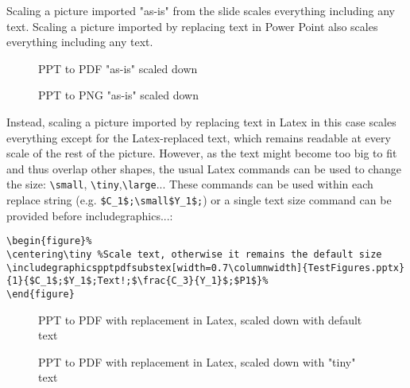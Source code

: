 \documentclass[10pt,,a4paper]{article}
\begin{document}
Scaling a picture imported "as-is" from the slide scales everything including any text.
Scaling a picture imported by replacing text in Power Point also scales everything including any text.
\begin{figure}
\centering{}%
\label{fig:}
\caption{PPT to PDF "as-is" scaled down}
\end{figure}
\begin{figure}
\centering{}%
\label{fig:}
\caption{PPT to PNG "as-is" scaled down}
\end{figure}


Instead, scaling a picture imported by replacing text in Latex in this case scales everything except for the Latex-replaced text, which remains readable at every scale of the rest of the picture.
However, as the text might become too big to fit and thus overlap other shapes, the usual Latex commands can be used to change the size:
\verb=\small=, \verb=\tiny=,\verb=\large=...
These commands can be used within each replace string (e.g. \verb!$C_1$;\small$Y_1$;!) or a single text size command can be provided before includegraphics...:
\begin{scriptsize}
\begin{verbatim}
\begin{figure}%
\centering\tiny %Scale text, otherwise it remains the default size
\includegraphicspptpdfsubstex[width=0.7\columnwidth]{TestFigures.pptx}{1}{$C_1$;$Y_1$;Text!;$\frac{C_3}{Y_1}$;$P1$}%
\end{figure}
\end{verbatim}
\end{scriptsize}

\begin{figure}%
\centering\tiny %
%
\caption{PPT to PDF with replacement in Latex, scaled down with default text}
\end{figure}
\begin{figure}%
\centering\tiny %
%
\caption{PPT to PDF with replacement in Latex, scaled down with "tiny" text}
\end{figure}
\end{document}
